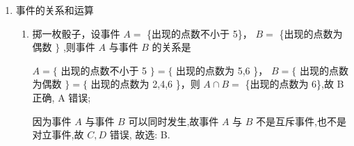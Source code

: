 \begin{enumerate}
\begin{enumerate}
\begin{jieda}
            故 600 人中大约有 ${600} \times  {78.7}\%  \approx  {472}$，故眼镜商应带滴眼液的瓶数应不少于 473 瓶
        \end{jieda}
        \item 下列说法正确的是
        \begin{jieda}
            A. 产品的次品率是通过大量的产品通过实验得到的数据，题目中的产品个数很少，故不正确； 
            
            B. 掷硬币正面或反面朝上的概率是通过大量实验得到的准确的值，和实验次数无关，故正确；
            
            C.解释同 A 选项, 也不正确;
            
            D. 事件的概率是大量实验后得到的结果, 是准确的值, 和实验次数无关, 但是 D 选项的说法体现的不是概率的概念, 故不正确.
        \end{jieda}
        \item 已知使用一剂某种药物治愈某种疾病的概率为 90\%，则下列说法正确的是
    \end{enumerate}
    
    \item 事件的关系和运算
    \begin{enumerate}
        \item 掷一枚骰子，设事件 $A =$ \{出现的点数不小于 5\}， $B =$ \{出现的点数为偶数 $\}$ ,则事件 $A$ 与事件 $B$ 的关系是
        \begin{jieda}
            $A = \{$ 出现的点数不小于 5 $\}  = \{$ 出现的点数为 5,6 \}， $B = \{$ 出现的点数为偶数 $\}  = \{$ 出现的点数为 2,4,6 \}，则 $A \cap  B =$ \{出现的点数为 6\},故 B 正确, A 错误;

            因为事件 $A$ 与事件 $B$ 可以同时发生,故事件 $A$ 与 $B$ 不是互斥事件,也不是对立事件,故 ${C},{D}$ 错误, 故选: B.
        \end{jieda}


\end{enumerate}
\end{enumerate}
